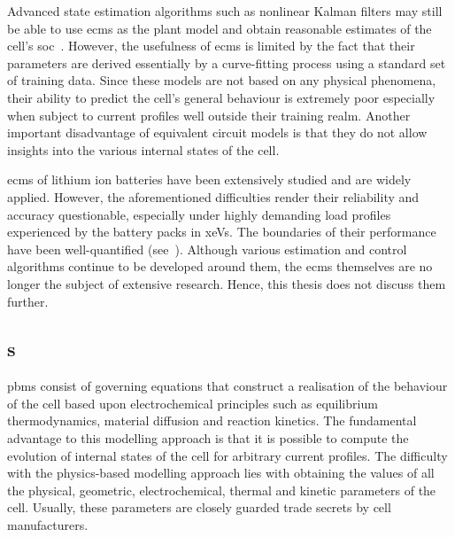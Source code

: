 Advanced state estimation algorithms such  as nonlinear Kalman filters may still
be able to use \glspl{ecm} as the plant model and obtain reasonable estimates of
the  cell's  \gls{soc}~\cite{Plett2006,  Sun2011}. However,  the  usefulness  of
\glspl{ecm} is limited by the fact that their parameters are derived essentially
by a  curve-fitting process using a  standard set of training  data. Since these
models are  not based on  any physical phenomena,  their ability to  predict the
cell's general behaviour  is extremely poor especially when  subject to current
profiles well  outside their training  realm. Another important  disadvantage of
equivalent circuit  models is that they  do not allow insights  into the various
internal states of the cell.

\glspl{ecm}  of  lithium  ion  batteries   have  been  extensively  studied  and
are  widely  applied.  However,  the aforementioned  difficulties  render  their
reliability and  accuracy questionable,  especially under highly  demanding load
profiles  experienced by  the battery  packs in  \glspl{xeV}. The  boundaries of
their  performance have  been well-quantified  (see~\cite{Plett2015,Plett2016}).
Although  various estimation  and control  algorithms continue  to be  developed
around them, the  \glspl{ecm} themselves are no longer the  subject of extensive
research. Hence, this thesis does not discuss them further.

\subsection{s}\label{subsec:pbms}


\glspl{pbm} consist of  governing equations that construct a  realisation of the
behaviour of the cell based  upon electrochemical principles such as equilibrium
thermodynamics,  material  diffusion  and  reaction  kinetics.  The  fundamental
advantage  to this  modelling approach  is that  it is  possible to  compute the
evolution of  internal states of  the cell  for arbitrary current  profiles. The
difficulty with  the physics-based  modelling approach  lies with  obtaining the
values  of all  the physical,  geometric, electrochemical,  thermal and  kinetic
parameters  of the  cell. Usually,  these parameters  are closely  guarded trade
secrets by cell manufacturers.

